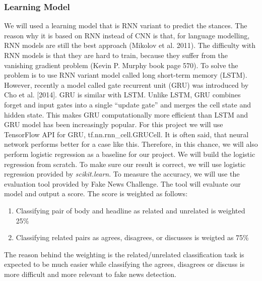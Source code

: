 \documentclass[12pt]{article}
\begin{document}
\subsubsection{Learning Model}
We will used a learning model that is  RNN variant to predict the stances. 
The reason why it is based on RNN instead of CNN is that, for language 
modelling, RNN models are still the best approach (Mikolov et al. 2011).
The difficulty with RNN models is that they are hard to train, because they 
suffer from the vanishing gradient problem (Kevin P. Murphy book page 570). 
To solve the problem is to use RNN variant model called long short-term 
memory (LSTM). 
However, recently a model called gate recurrent unit (GRU) was introduced by 
Cho et al. [2014].
GRU is similar with LSTM. Unlike LSTM, GRU combines forget and input gates 
into a single “update gate” and merges the cell state and hidden state.
This makes GRU computationally more efficient than LSTM and GRU model has 
been increasingly popular. For this project we will use TensorFlow API for GRU,
tf.nn.rnn\_cell.GRUCell. 
It is often said, that neural network performs better for a case like this. 
Therefore, in this chance, we will also perform logistic regression as a 
baseline for our project. We will build the logistic regression from scratch.
To make sure our result is correct, we will use logistic regression provided by
\textit{scikit.learn}.
To measure the accuracy, we will use the evaluation tool provided by 
Fake News Challenge. The tool will evaluate our model and output a score. 
The score is weighted as follows:
\begin{enumerate}
    \item Classifying pair of body and headline as related and unrelated is weighted 25\%
    \item Classifying related pairs as agrees, disagrees, or discusses is weigted as 75\%
\end{enumerate}
The reason behind the weighting is the related/unrelated classification task is expected to be much easier while classifying the agrees, disagrees or discuss is more difficult and more relevant to fake news detection.
\end{document}
